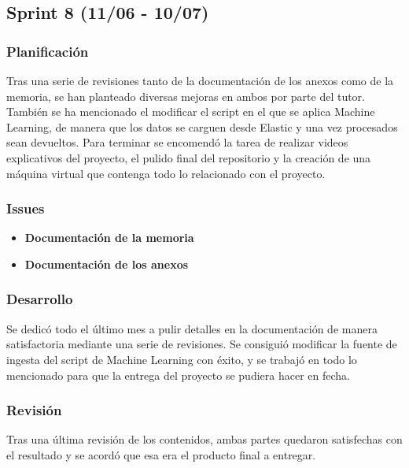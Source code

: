 \subsection{Sprint 8 (11/06 - 10/07)}
\subsubsection{Planificación}
Tras una serie de revisiones tanto de la documentación de los anexos como de la memoria, se han planteado diversas mejoras en ambos por parte del tutor. También se ha mencionado el modificar el script en el que se aplica Machine Learning, de manera que los datos se carguen desde Elastic y una vez procesados sean devueltos. Para terminar se encomendó la tarea de realizar videos explicativos del proyecto, el pulido final del repositorio y la creación de una máquina virtual que contenga todo lo relacionado con el proyecto.

\subsubsection{Issues}
\begin{itemize}


    \item \textbf{Documentación de la memoria}
    \item \textbf{Documentación de los anexos}



\end{itemize}

\subsubsection{Desarrollo}
Se dedicó todo el último mes a pulir detalles en la documentación de manera satisfactoria mediante una serie de revisiones. Se consiguió modificar la fuente de ingesta del script de Machine Learning con éxito, y se trabajó en todo lo mencionado para que la entrega del proyecto se pudiera hacer en fecha.

\subsubsection{Revisión}
Tras una última revisión de los contenidos, ambas partes quedaron satisfechas con el resultado y se acordó que esa era el producto final a entregar.

\paragraph{}

